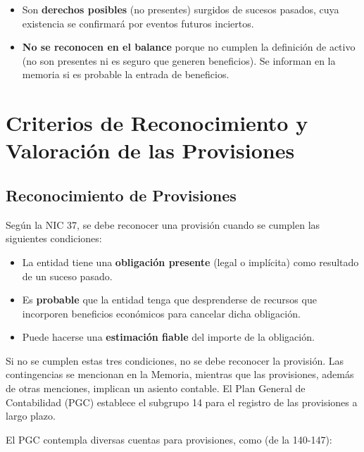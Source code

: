 \documentclass[
  paper=a4,
  ,captions=tableheading
]{scrbook}
\providecommand{\tightlist}{%
  \setlength{\itemsep}{0pt}\setlength{\parskip}{0pt}}
\begin{document}
\begin{itemize}
\tightlist
\item
  Son \textbf{derechos posibles} (no presentes) surgidos de sucesos
  pasados, cuya existencia se confirmará por eventos futuros inciertos.
\item
  \textbf{No se reconocen en el balance} porque no cumplen la definición
  de activo (no son presentes ni es seguro que generen beneficios). Se
  informan en la memoria si es probable la entrada de beneficios.
\end{itemize}

\hypertarget{criterios-de-reconocimiento-y-valoraciuxf3n-de-las-provisiones}{%
\section{Criterios de Reconocimiento y Valoración de las
Provisiones}\label{criterios-de-reconocimiento-y-valoraciuxf3n-de-las-provisiones}}

\hypertarget{reconocimiento-de-provisiones}{%
\subsection{Reconocimiento de
Provisiones}\label{reconocimiento-de-provisiones}}

Según la NIC 37, se debe reconocer una provisión cuando se cumplen las
siguientes condiciones:

\begin{itemize}
\tightlist
\item
  La entidad tiene una \textbf{obligación presente} (legal o implícita)
  como resultado de un suceso pasado.
\item
  Es \textbf{probable} que la entidad tenga que desprenderse de recursos
  que incorporen beneficios económicos para cancelar dicha obligación.
\item
  Puede hacerse una \textbf{estimación fiable} del importe de la
  obligación.
\end{itemize}

Si no se cumplen estas tres condiciones, no se debe reconocer la
provisión. Las contingencias se mencionan en la Memoria, mientras que
las provisiones, además de otras menciones, implican un asiento
contable. El Plan General de Contabilidad (PGC) establece el subgrupo 14
para el registro de las provisiones a largo plazo.

El PGC contempla diversas cuentas para provisiones, como (de la
140-147):
\end{document}
